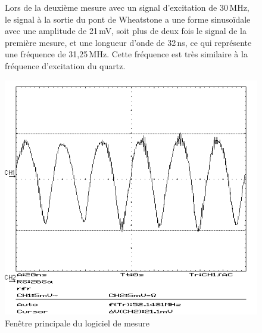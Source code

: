 \begin{figure}[H]
    \centering
    \begin{minipage}{0.48\textwidth}
        \small
        Lors de la deuxième mesure avec un signal d'excitation de 30\,MHz, le signal à la sortie du pont de Wheatstone a une forme sinusoïdale avec une amplitude de 21\,mV, soit plus de deux fois le signal de la première mesure, et une longueur d'onde de 32\,ns, ce qui représente une fréquence de 31,25\,MHz.
        Cette fréquence est très similaire à la fréquence d'excitation du quartz.
    \end{minipage}\hfill
    \begin{minipage}{0.48\textwidth}
        \centering
        \includegraphics[width=\textwidth]{assets/figures/SCR00007.png}
        \caption{Fenêtre principale du logiciel de mesure}
        \label{fig:30mhzbruit}
    \end{minipage}
\end{figure}

